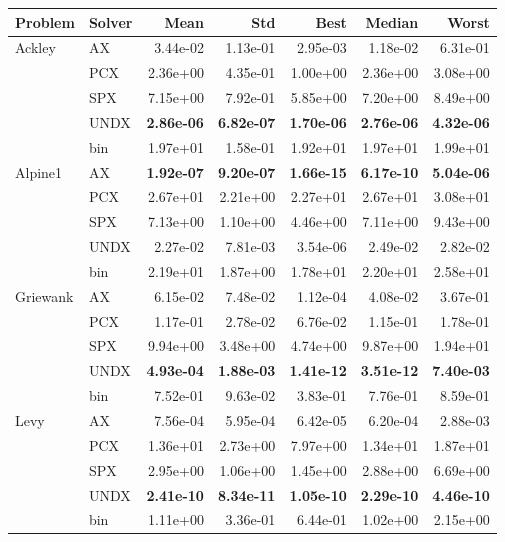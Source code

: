 \begin{tabular}{llrrrrr}
\toprule
Problem & Solver & Mean & Std & Best & Median & Worst \\
\midrule
Ackley & AX & 3.44e-02 & 1.13e-01 & 2.95e-03 & 1.18e-02 & 6.31e-01 \\
\addlinespace
 & PCX & 2.36e+00 & 4.35e-01 & 1.00e+00 & 2.36e+00 & 3.08e+00 \\
& SPX & 7.15e+00 & 7.92e-01 & 5.85e+00 & 7.20e+00 & 8.49e+00 \\
& UNDX & \textbf{2.86e-06} & \textbf{6.82e-07} & \textbf{1.70e-06} & \textbf{2.76e-06} & \textbf{4.32e-06} \\
& bin & 1.97e+01 & 1.58e-01 & 1.92e+01 & 1.97e+01 & 1.99e+01 \\
\addlinespace
\addlinespace
Alpine1 & AX & \textbf{1.92e-07} & \textbf{9.20e-07} & \textbf{1.66e-15} & \textbf{6.17e-10} & \textbf{5.04e-06} \\
\addlinespace
 & PCX & 2.67e+01 & 2.21e+00 & 2.27e+01 & 2.67e+01 & 3.08e+01 \\
& SPX & 7.13e+00 & 1.10e+00 & 4.46e+00 & 7.11e+00 & 9.43e+00 \\
& UNDX & 2.27e-02 & 7.81e-03 & 3.54e-06 & 2.49e-02 & 2.82e-02 \\
& bin & 2.19e+01 & 1.87e+00 & 1.78e+01 & 2.20e+01 & 2.58e+01 \\
\addlinespace
\addlinespace
Griewank & AX & 6.15e-02 & 7.48e-02 & 1.12e-04 & 4.08e-02 & 3.67e-01 \\
\addlinespace
 & PCX & 1.17e-01 & 2.78e-02 & 6.76e-02 & 1.15e-01 & 1.78e-01 \\
& SPX & 9.94e+00 & 3.48e+00 & 4.74e+00 & 9.87e+00 & 1.94e+01 \\
& UNDX & \textbf{4.93e-04} & \textbf{1.88e-03} & \textbf{1.41e-12} & \textbf{3.51e-12} & \textbf{7.40e-03} \\
& bin & 7.52e-01 & 9.63e-02 & 3.83e-01 & 7.76e-01 & 8.59e-01 \\
\addlinespace
\addlinespace
Levy & AX & 7.56e-04 & 5.95e-04 & 6.42e-05 & 6.20e-04 & 2.88e-03 \\
\addlinespace
 & PCX & 1.36e+01 & 2.73e+00 & 7.97e+00 & 1.34e+01 & 1.87e+01 \\
& SPX & 2.95e+00 & 1.06e+00 & 1.45e+00 & 2.88e+00 & 6.69e+00 \\
& UNDX & \textbf{2.41e-10} & \textbf{8.34e-11} & \textbf{1.05e-10} & \textbf{2.29e-10} & \textbf{4.46e-10} \\
& bin & 1.11e+00 & 3.36e-01 & 6.44e-01 & 1.02e+00 & 2.15e+00 \\

\end{tabular}
